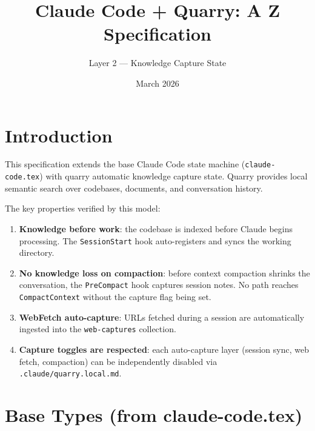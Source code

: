 \documentclass[a4paper,10pt,fleqn]{article}
\begin{document}
\title{Claude Code + Quarry: A Z Specification}
\author{Layer 2 --- Knowledge Capture State}
\date{March 2026}
\maketitle

\tableofcontents
\newpage

\section{Introduction}

This specification extends the base Claude Code state machine
(\texttt{claude-code.tex}) with quarry automatic knowledge capture
state. Quarry provides local semantic search over codebases,
documents, and conversation history.

The key properties verified by this model:

\begin{enumerate}
  \item \textbf{Knowledge before work}: the codebase is indexed
    before Claude begins processing. The \texttt{SessionStart} hook
    auto-registers and syncs the working directory.
  \item \textbf{No knowledge loss on compaction}: before context
    compaction shrinks the conversation, the \texttt{PreCompact} hook
    captures session notes. No path reaches \texttt{CompactContext}
    without the capture flag being set.
  \item \textbf{WebFetch auto-capture}: URLs fetched during a session
    are automatically ingested into the \texttt{web-captures} collection.
  \item \textbf{Capture toggles are respected}: each auto-capture
    layer (session sync, web fetch, compaction) can be independently
    disabled via \texttt{.claude/quarry.local.md}.
\end{enumerate}

\section{Base Types (from claude-code.tex)}
\end{document}

